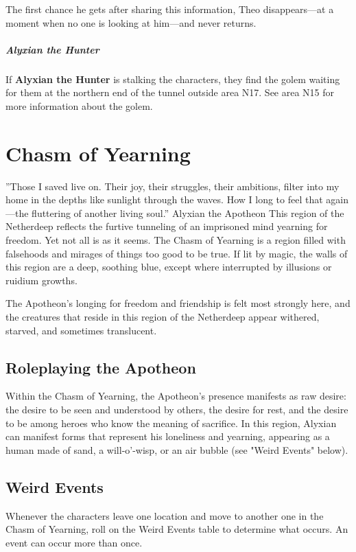 \documentclass[10pt,a4paper,twoside,bg=print,twocolumn,openany,nodeprecatedcode]{dndbook}
\begin{document}
The first chance he gets after sharing this information, Theo disappears—at a moment when no one is looking at him—and never returns.

\subparagraph{Alyxian the Hunter}
If \textbf{Alyxian the Hunter} is stalking the characters, they find the golem waiting for them at the northern end of the tunnel outside area N17. See area N15 for more information about the golem.

\section{Chasm of Yearning}
\DndQuote%
{}
{''Those I saved live on. Their joy, their struggles, their ambitions, filter into my home in the depths like sunlight through the waves. How I long to feel that again—the fluttering of another living soul.''}
{Alyxian the Apotheon}
This region of the Netherdeep reflects the furtive tunneling of an imprisoned mind yearning for freedom. Yet not all is as it seems. The Chasm of Yearning is a region filled with falsehoods and mirages of things too good to be true. If lit by magic, the walls of this region are a deep, soothing blue, except where interrupted by illusions or ruidium growths.

The Apotheon's longing for freedom and friendship is felt most strongly here, and the creatures that reside in this region of the Netherdeep appear withered, starved, and sometimes translucent.

\subsection{Roleplaying the Apotheon}
Within the Chasm of Yearning, the Apotheon's presence manifests as raw desire: the desire to be seen and understood by others, the desire for rest, and the desire to be among heroes who know the meaning of sacrifice. In this region, Alyxian can manifest forms that represent his loneliness and yearning, appearing as a human made of sand, a will-o'-wisp, or an air bubble (see "Weird Events" below).

\subsection{Weird Events}
Whenever the characters leave one location and move to another one in the Chasm of Yearning, roll on the Weird Events table to determine what occurs. An event can occur more than once.
\end{document}
